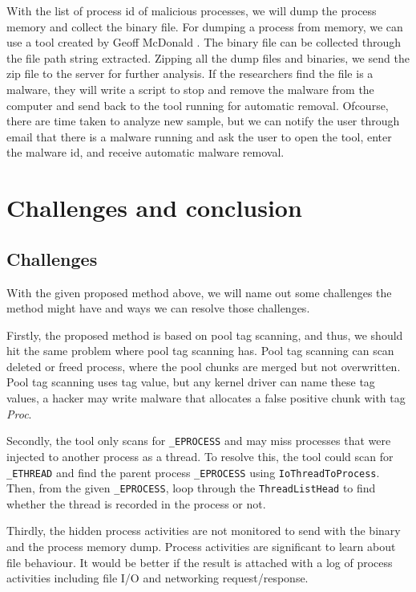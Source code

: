 With the list of process id of malicious processes, we will dump the process memory and collect the binary file. For dumping a process from memory, we can use a tool created by Geoff McDonald \cite{processdump}. The binary file can be collected through the file path string extracted. Zipping all the dump files and binaries, we send the zip file to the server for further analysis. If the researchers find the file is a malware, they will write a script to stop and remove the malware from the computer and send back to the tool running for automatic removal. Ofcourse, there are time taken to analyze new sample, but we can notify the user through email that there is a malware running and ask the user to open the tool, enter the malware id, and receive automatic malware removal.

\chapter[Challenges and conclusion]{Challenges and conclusion}

\section[Challenges]{Challenges}

With the given proposed method above, we will name out some challenges the method might have and ways we can resolve those challenges.

Firstly, the proposed method is based on pool tag scanning, and thus, we should hit the same problem where pool tag scanning has. Pool tag scanning can scan deleted or freed process, where the pool chunks are merged but not overwritten. Pool tag scanning uses tag value, but any kernel driver can name these tag values, a hacker may write malware that allocates a false positive chunk with tag \textit{Proc}.

Secondly, the tool only scans for \texttt{\_EPROCESS} and may miss processes that were injected to another process as a thread. To resolve this, the tool could scan for \texttt{\_ETHREAD} and find the parent process \texttt{\_EPROCESS} using \texttt{IoThreadToProcess}. Then, from the given \texttt{\_EPROCESS}, loop through the \texttt{ThreadListHead} to find whether the thread is recorded in the process or not.

Thirdly, the hidden process activities are not monitored to send with the binary and the process memory dump. Process activities are significant to learn about file behaviour. It would be better if the result is attached with a log of process activities including file I/O and networking request/response.

